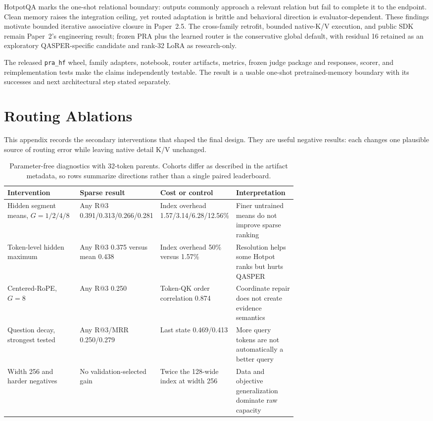 \documentclass[11pt]{article}
\begin{document}
HotpotQA marks the one-shot relational boundary: outputs commonly approach a relevant relation but
fail to complete it to the endpoint. Clean memory raises the integration ceiling, yet routed
adaptation is brittle and behavioral direction is evaluator-dependent. These findings motivate
bounded iterative associative closure in Paper~2.5. The cross-family retrofit, bounded native-K/V
execution, and public SDK remain Paper~2's engineering result; frozen PRA plus the learned router
is the conservative global default, with residual 16 retained as an exploratory QASPER-specific
candidate and rank-32 LoRA as research-only.

The released \texttt{pra\_hf} wheel, family adapters, notebook, router artifacts, metrics, frozen
judge package and responses, scorer, and reimplementation tests make the claims independently
testable. The result is a usable one-shot pretrained-memory boundary with its successes and next
architectural step stated separately.

\section{Routing Ablations}
\label{app:routing-ablations}

This appendix records the secondary interventions that shaped the final design. They are useful
negative results: each changes one plausible source of routing error while leaving native detail
K/V unchanged.

\begin{table}[!htbp]
\centering
\scriptsize
\caption{Parameter-free diagnostics with 32-token parents. Cohorts differ as described in the
artifact metadata, so rows summarize directions rather than a single paired leaderboard.}
\label{tab:routing-ablations}
\begin{tabularx}{\linewidth}{L{0.25\linewidth}L{0.23\linewidth}L{0.20\linewidth}Y}
\toprule
Intervention & Sparse result & Cost or control & Interpretation \\
\midrule
Hidden segment means, $G=1/2/4/8$ & Any R@3 0.391/0.313/0.266/0.281 & Index overhead 1.57/3.14/6.28/12.56\% & Finer untrained means do not improve sparse ranking \\
Token-level hidden maximum & Any R@3 0.375 versus mean 0.438 & Index overhead 50\% versus 1.57\% & Resolution helps some Hotpot ranks but hurts QASPER \\
Centered-RoPE, $G=8$ & Any R@3 0.250 & Token-QK order correlation 0.874 & Coordinate repair does not create evidence semantics \\
Question decay, strongest tested & Any R@3/MRR 0.250/0.279 & Last state 0.469/0.413 & More query tokens are not automatically a better query \\
Width 256 and harder negatives & No validation-selected gain & Twice the 128-wide index at width 256 & Data and objective generalization dominate raw capacity \\
\bottomrule
\end{tabularx}
\end{table}
\end{document}
